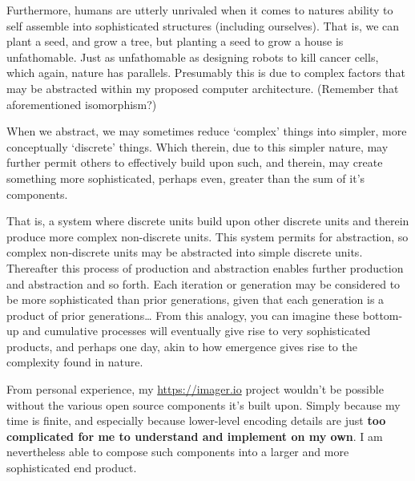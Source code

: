 Furthermore, humans are utterly unrivaled when it comes to natures ability to self assemble into sophisticated structures (including ourselves). That is, we can plant a seed, and grow a tree, but planting a seed to grow a house is unfathomable. Just as unfathomable as designing robots to kill cancer cells, which again, nature has parallels.  Presumably this is due to complex factors that may be abstracted within my proposed computer architecture. (Remember that aforementioned isomorphism?)

When we abstract, we may sometimes reduce `complex' things into simpler, more conceptually `discrete' things. Which therein, due to this simpler nature, may further permit others to effectively build upon such, and therein, may create something more sophisticated, perhaps even, greater than the sum of it's components. 

That is, a system where discrete units build upon other discrete units and therein produce more complex non-discrete units. This system permits for abstraction, so complex non-discrete units may be abstracted into simple discrete units. Thereafter this process of production and abstraction enables further production and abstraction and so forth. Each iteration or generation may be considered to be more sophisticated than prior generations, given that each generation is a product of prior generations… From this analogy, you can imagine these bottom-up and cumulative processes will eventually give rise to very sophisticated products, and perhaps one day, akin to how emergence gives rise to the complexity found in nature.

From personal experience, my \url{https://imager.io} project wouldn’t be possible without the various open source components it’s built upon. Simply because my time is finite, and especially because lower-level encoding details are just \textbf{too complicated for me to understand and implement on my own}. I am nevertheless able to compose such components into a larger and more sophisticated end product.



